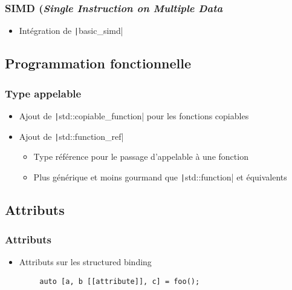 \documentclass[C++.tex]{subfiles}
\begin{document}
\begin{frame}[fragile]
	\frametitle{SIMD (\textit{Single Instruction on Multiple Data}}
	\begin{itemize}
		\item Intégration de \texttt|basic_simd|
	\end{itemize}

\end{frame}

\subsection*{Programmation fonctionnelle}
\begin{frame}[fragile]
	\frametitle{Type appelable}
	\begin{itemize}
		\item Ajout de \texttt|std::copiable_function| pour les fonctions copiables
		\item Ajout de \texttt|std::function_ref|
		\begin{itemize}
			\item Type référence pour le passage d'appelable à une fonction
			\item Plus générique et moins gourmand que \texttt|std::function| et équivalents

		\end{itemize}
	\end{itemize}

\end{frame}

\subsection*{Attributs}
\begin{frame}[fragile]
	\frametitle{Attributs}
	\begin{itemize}
		\item Attributs sur les structured binding
	\end{itemize}

	\begin{verbatim}
		auto [a, b [[attribute]], c] = foo();
	\end{verbatim}

\end{frame}
\end{document}
